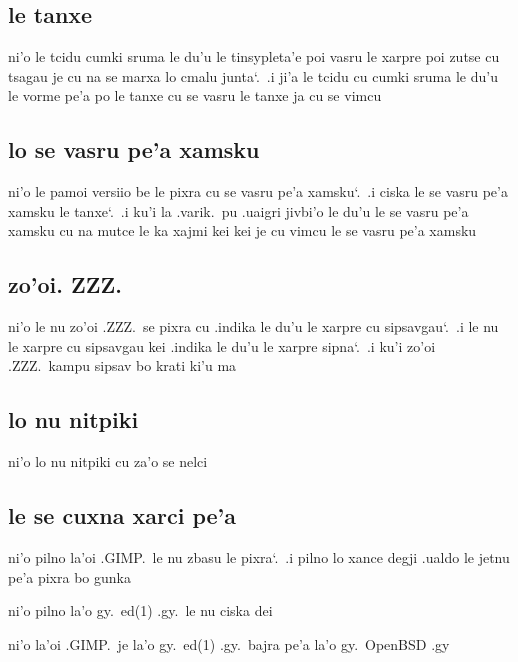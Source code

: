 \documentclass{report}
\newcommand\sds{\spacefactor\sfcode`.\ \space}
\begin{document}
\subsection{le tanxe}
ni'o le tcidu cumki sruma le du'u le tinsypleta'e poi vasru le xarpre poi zutse cu tsagau je cu na se marxa lo cmalu junta\sds  .i ji'a le tcidu cu cumki sruma le du'u le vorme pe'a po le tanxe cu se vasru le tanxe ja cu se vimcu

\subsection{lo se vasru pe'a xamsku}
ni'o le pamoi versiio be le pixra cu se vasru pe'a xamsku\sds  .i ciska le se vasru pe'a xamsku le tanxe\sds  .i ku'i la .varik.\ pu .uaigri jivbi'o le du'u le se vasru pe'a xamsku cu na mutce le ka xajmi kei kei je cu vimcu le se vasru pe'a xamsku

\subsection{zo'oi. ZZZ.}
ni'o le nu zo'oi .ZZZ.\ se pixra cu .indika le du'u le xarpre cu sipsavgau\sds  .i le nu le xarpre cu sipsavgau kei .indika le du'u le xarpre sipna\sds  .i ku'i zo'oi .ZZZ.\ kampu sipsav bo krati ki'u ma

\subsection{lo nu nitpiki}
ni'o lo nu nitpiki cu za'o se nelci

\subsection{le se cuxna xarci pe'a}
ni'o pilno la'oi .GIMP.\ le nu zbasu le pixra\sds  .i pilno lo xance degji .ualdo le jetnu pe'a pixra bo gunka

ni'o pilno la'o gy.\ ed(1) .gy.\ le nu ciska dei

ni'o la'oi .GIMP.\ je la'o gy.\ ed(1) .gy.\ bajra pe'a la'o gy.\ OpenBSD .gy
\end{document}
